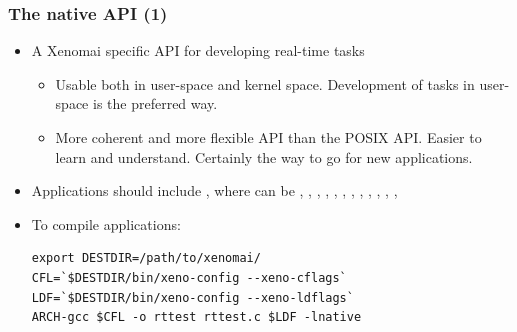 \begin{frame}[fragile]
  \frametitle{The native API (1)}
  \begin{itemize}
  \item A Xenomai specific API for developing real-time tasks
    \begin{itemize}
    \item Usable both in user-space and kernel space. Development of
      tasks in user-space is the preferred way.
    \item More coherent and more flexible API than the POSIX
      API. Easier to learn and understand. Certainly the way to go for
      new applications.
    \end{itemize}
  \item Applications should include  , where
     can be , , ,
    , , , , ,
    , , , , 
  \item To compile applications:
    \begin{block}{}
\small
\begin{verbatim}
export DESTDIR=/path/to/xenomai/
CFL=`$DESTDIR/bin/xeno-config --xeno-cflags`
LDF=`$DESTDIR/bin/xeno-config --xeno-ldflags`
ARCH-gcc $CFL -o rttest rttest.c $LDF -lnative
\end{verbatim}
\normalsize
    \end{block}
  \end{itemize}
\end{frame}

